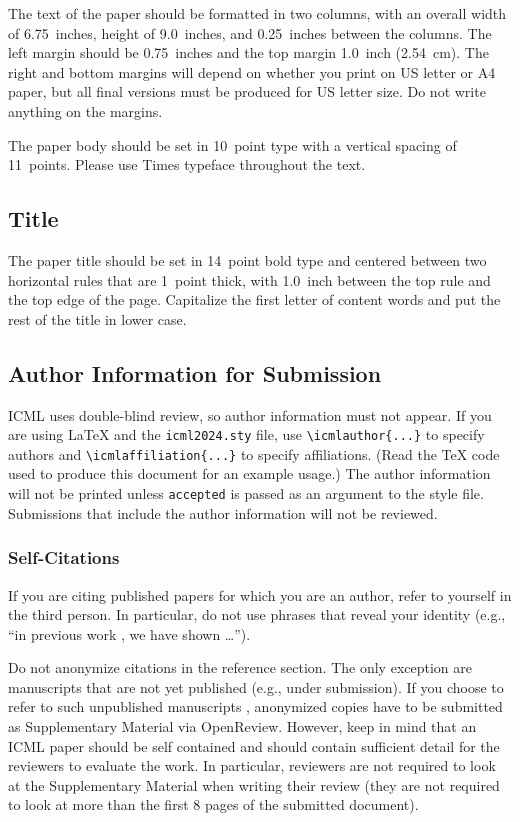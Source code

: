 \documentclass{article}
\theoremstyle{plain}
\theoremstyle{definition}
\theoremstyle{remark}
\begin{document}
The text of the paper should be formatted in two columns, with an
overall width of 6.75~inches, height of 9.0~inches, and 0.25~inches
between the columns. The left margin should be 0.75~inches and the top
margin 1.0~inch (2.54~cm). The right and bottom margins will depend on
whether you print on US letter or A4 paper, but all final versions
must be produced for US letter size.
Do not write anything on the margins.

The paper body should be set in 10~point type with a vertical spacing
of 11~points. Please use Times typeface throughout the text.

\subsection{Title}

The paper title should be set in 14~point bold type and centered
between two horizontal rules that are 1~point thick, with 1.0~inch
between the top rule and the top edge of the page. Capitalize the
first letter of content words and put the rest of the title in lower
case.

\subsection{Author Information for Submission}
\label{author info}

ICML uses double-blind review, so author information must not appear. If
you are using \LaTeX\/ and the \texttt{icml2024.sty} file, use
\verb+\icmlauthor{...}+ to specify authors and \verb+\icmlaffiliation{...}+ to specify affiliations. (Read the TeX code used to produce this document for an example usage.) The author information
will not be printed unless \texttt{accepted} is passed as an argument to the
style file.
Submissions that include the author information will not
be reviewed.

\subsubsection{Self-Citations}

If you are citing published papers for which you are an author, refer
to yourself in the third person. In particular, do not use phrases
that reveal your identity (e.g., ``in previous work \cite{langley00}, we
have shown \ldots'').

Do not anonymize citations in the reference section. The only exception are manuscripts that are
not yet published (e.g., under submission). If you choose to refer to
such unpublished manuscripts \cite{anonymous}, anonymized copies have
to be submitted
as Supplementary Material via OpenReview\@. However, keep in mind that an ICML
paper should be self contained and should contain sufficient detail
for the reviewers to evaluate the work. In particular, reviewers are
not required to look at the Supplementary Material when writing their
review (they are not required to look at more than the first $8$ pages of the submitted document).
\end{document}
